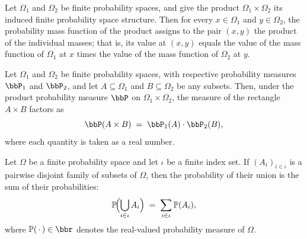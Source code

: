 \begin{theorem}
\label{CommunicationComplexity.FiniteProbabilitySpace.pmf_prod}
\leanok
{}
Let $\Omega_1$ and $\Omega_2$ be finite probability spaces, and give the product
$\Omega_1 \times \Omega_2$ its induced finite probability space structure. Then for
every $x \in \Omega_1$ and $y \in \Omega_2$, the probability mass function of the
product assigns to the pair $(x, y)$ the product of the individual masses; that is, its
value at $(x, y)$ equals the value of the mass function of $\Omega_1$ at $x$ times the
value of the mass function of $\Omega_2$ at $y$.
\end{theorem}

\begin{theorem}
\label{CommunicationComplexity.FiniteProbabilitySpace.measureReal_prod}
\leanok
{}
Let $\Omega_1$ and $\Omega_2$ be finite probability spaces, with respective probability
measures $\bbP_1$ and $\bbP_2$, and let $A \subseteq \Omega_1$ and $B \subseteq
\Omega_2$ be any subsets. Then, under the product probability measure $\bbP$ on
$\Omega_1 \times \Omega_2$, the measure of the rectangle $A \times B$ factors as
\[
  \bbP(A \times B) \;=\; \bbP_1(A) \cdot \bbP_2(B),
\]
where each quantity is taken as a real number.
\end{theorem}

\begin{theorem}
\label{CommunicationComplexity.FiniteProbabilitySpace.measureReal_iUnion_fintype}
\leanok
{}
Let $\Omega$ be a finite probability space and let $\iota$ be a finite index set. If
$(A_i)_{i \in \iota}$ is a pairwise disjoint family of subsets of $\Omega$, then the
probability of their union is the sum of their probabilities:
\[
\mathbb{P}\!\Bigl(\bigcup_{i \in \iota} A_i\Bigr) \;=\; \sum_{i \in \iota}
\mathbb{P}(A_i),
\]
where $\mathbb{P}(\,\cdot\,) \in \bbr$ denotes the real-valued probability measure of
$\Omega$.
\end{theorem}

